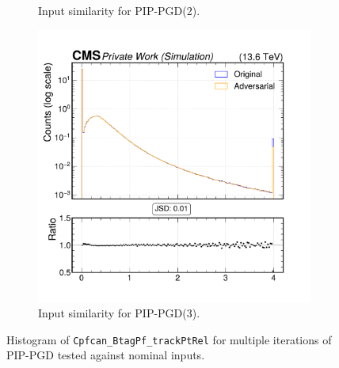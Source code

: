 \begin{figure}[h]
\begin{subfigure}[t]{0.32\textwidth}
    \caption*{Input similarity for PIP-PGD(2).}
  \end{subfigure}\hfill
  \begin{subfigure}[t]{0.32\textwidth}
    \includegraphics[width=\linewidth]{media/output/features/compare/combined_it_3/cmp_cpf_arr_Cpfcan_BtagPf_trackPtRel.pdf}
    \caption*{Input similarity for PIP-PGD(3).}
  \end{subfigure}

  \caption*{Histogram of \texttt{Cpfcan\_BtagPf\_trackPtRel} for multiple iterations of PIP-PGD tested against nominal inputs.}
  \label{fig:combined_input_Cpfcan_BtagPf_trackPtRel}
\end{figure}

